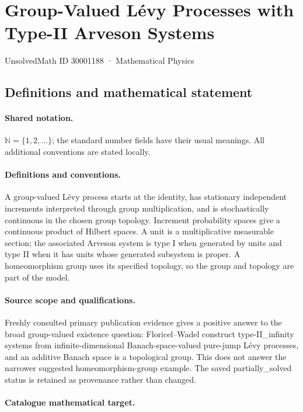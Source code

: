 \documentclass[11pt]{article}
\begin{document}
\setcounter{section}{30001187}
\section{Group-Valued Lévy Processes with Type-II Arveson Systems}\label{30001188}
{\small UnsolvedMath ID 30001188 · Mathematical Physics}
\subsection{Definitions and mathematical statement}

\paragraph{Shared notation.}$\mathbb N=\{1,2,\ldots\}$; the standard number fields have their usual meanings. All additional conventions are stated locally.


\paragraph{Definitions and conventions.} A group-valued Lévy process starts at the identity, has stationary independent increments interpreted through group multiplication, and is stochastically continuous in the chosen group topology. Increment probability spaces give a continuous product of Hilbert spaces. A unit is a multiplicative measurable section; the associated Arveson system is type I when generated by units and type II when it has units whose generated subsystem is proper. A homeomorphism group uses its specified topology, so the group and topology are part of the model.

\paragraph{Source scope and qualifications.} Freshly consulted primary publication evidence gives a positive answer to the broad group-valued existence question: Floricel--Wadel construct type-II\_infinity systems from infinite-dimensional Banach-space-valued pure-jump Lévy processes, and an additive Banach space is a topological group. This does not answer the narrower suggested homeomorphism-group example. The saved partially\_solved status is retained as provenance rather than changed.

\paragraph{Catalogue mathematical target.}
\end{document}
